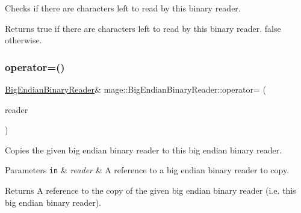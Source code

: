 Checks if there are characters left to read by this binary reader.

\begin{DoxyReturn}{Returns}
{\ttfamily true} if there are characters left to read by this binary reader. {\ttfamily false} otherwise. 
\end{DoxyReturn}
\hypertarget{classmage_1_1_big_endian_binary_reader_abd4b24df4219469a8c2e9253b1cad405}{}\label{classmage_1_1_big_endian_binary_reader_abd4b24df4219469a8c2e9253b1cad405} 
\subsubsection{\texorpdfstring{operator=()}{operator=()}\hspace{0.1cm}{\footnotesize\ttfamily [1/2]}}
{\footnotesize\ttfamily \hyperlink{classmage_1_1_big_endian_binary_reader}{Big\+Endian\+Binary\+Reader}\& mage\+::\+Big\+Endian\+Binary\+Reader\+::operator= (\begin{DoxyParamCaption}\item[{const \hyperlink{classmage_1_1_big_endian_binary_reader}{Big\+Endian\+Binary\+Reader} \&}]{reader }\end{DoxyParamCaption})\hspace{0.3cm}{\ttfamily [delete]}}

Copies the given big endian binary reader to this big endian binary reader.


\begin{DoxyParams}[1]{Parameters}
\mbox{\tt in}  & {\em reader} & A reference to a big endian binary reader to copy. \\
\hline
\end{DoxyParams}
\begin{DoxyReturn}{Returns}
A reference to the copy of the given big endian binary reader (i.\+e. this big endian binary reader). 
\end{DoxyReturn}
\hypertarget{classmage_1_1_big_endian_binary_reader_a9e2e0dd62afff04774d0246f7e5e4ce4}{}\label{classmage_1_1_big_endian_binary_reader_a9e2e0dd62afff04774d0246f7e5e4ce4} 
